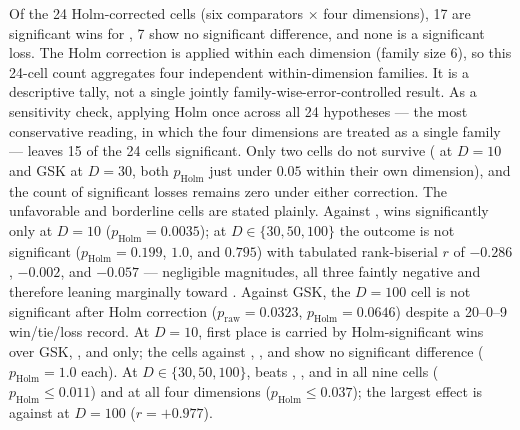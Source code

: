 \begin{table}[H]
\caption{\dtgsk{} vs.\ each GSK-family comparator on CEC2017 (29
functions, 51 runs, per-function mean error), in two aligned sub-tables:
$D \in \{10, 30\}$ above, $D \in \{50, 100\}$ below. Columns are the
across-function Wilcoxon signed-rank $p$ and its Holm-corrected value
(family $= 6$ comparators per dimension, $\alpha = 0.05$), win/tie/loss
counts with tie rule $|\Delta| < 10^{-8}$, the matched-pairs rank-biserial
effect size $r$ ($> 0$ favors \dtgsk{}), and the Holm decision ($+$ better,
$\approx$ no significant difference, $-$ worse).}\label{tab:wilcoxon-holm}
\centering
\tablesize{\footnotesize}
\setlength{\tabcolsep}{2.6pt}

\end{table}

Of the 24 Holm-corrected cells (six comparators $\times$ four
dimensions), 17 are significant wins for \dtgsk{}, 7 show no
significant difference, and none is a significant loss. The Holm correction is
applied within each dimension (family size 6), so this 24-cell count aggregates
four independent within-dimension families. It is a descriptive tally,
not a single jointly family-wise-error-controlled result.
As a sensitivity check, applying Holm once across all 24 hypotheses --- the
most conservative reading, in which the four dimensions are treated as a
single family --- leaves 15 of the 24 cells significant. Only two cells do
not survive (\atmals{} at $D = 10$ and GSK at $D = 30$, both
$p_{\mathrm{Holm}}$ just under $0.05$ within their own dimension), and the
count of significant losses remains zero under either correction.
The unfavorable and borderline cells are stated plainly. Against
\egsk{}, \dtgsk{} wins significantly only at $D = 10$
($p_{\mathrm{Holm}} = 0.0035$); at $D \in \{30, 50, 100\}$ the
outcome is not significant ($p_{\mathrm{Holm}} = 0.199$, $1.0$, and $0.795$)
with tabulated rank-biserial $r$ of $-0.286$, $-0.002$, and $-0.057$ ---
negligible magnitudes, all three faintly negative and therefore leaning
marginally toward \egsk{}.
Against GSK, the $D = 100$ cell is not significant after Holm correction
($p_{\mathrm{raw}} = 0.0323$, $p_{\mathrm{Holm}} = 0.0646$) despite a
20--0--9 win/tie/loss record.
At $D = 10$, first place is carried by Holm-significant wins over
GSK, \atmals{}, and \egsk{} only; the cells against \agsk{},
\apgsk{}, and \fdbagsk{} show no significant difference
($p_{\mathrm{Holm}} = 1.0$ each).
At $D \in \{30, 50, 100\}$, \dtgsk{} beats \agsk{}, \apgsk{}, and
\fdbagsk{} in all nine cells ($p_{\mathrm{Holm}} \leq 0.011$) and
\atmals{} at all four dimensions
($p_{\mathrm{Holm}} \leq 0.037$); the largest effect is against
\apgsk{} at $D = 100$ ($r = +0.977$).

